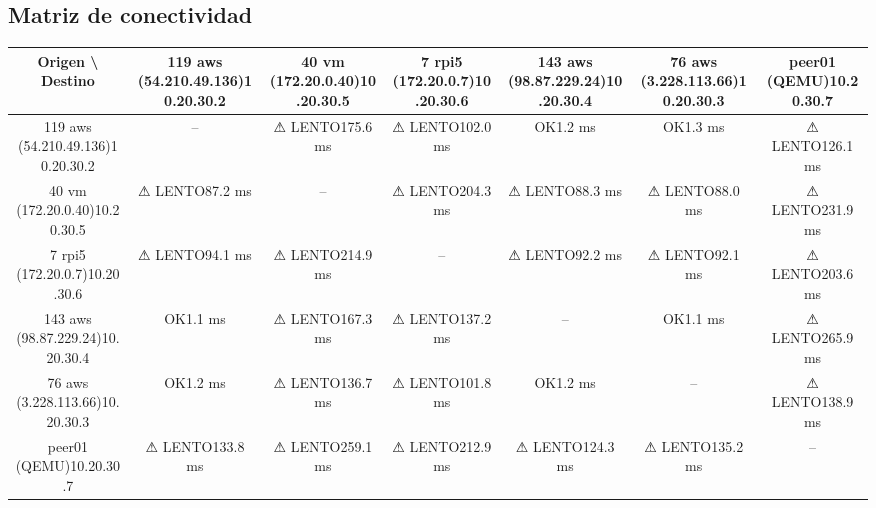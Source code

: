 \documentclass[11pt,a4paper]{article}
\begin{document}
\subsection{Matriz de conectividad}
\begin{longtable}{|c|c|c|c|c|c|c|}
\hline
Origen \textbackslash{} Destino & 119 aws (54.210.49.136)10.20.30.2 & 40 vm (172.20.0.40)10.20.30.5 & 7 rpi5 (172.20.0.7)10.20.30.6 & 143 aws (98.87.229.24)10.20.30.4 & 76 aws (3.228.113.66)10.20.30.3 & peer01 (QEMU)10.20.30.7 \\ \hline
119 aws (54.210.49.136)10.20.30.2 & -- & ⚠ LENTO175.6 ms & ⚠ LENTO102.0 ms & OK1.2 ms & OK1.3 ms & ⚠ LENTO126.1 ms \\ \hline
40 vm (172.20.0.40)10.20.30.5 & ⚠ LENTO87.2 ms & -- & ⚠ LENTO204.3 ms & ⚠ LENTO88.3 ms & ⚠ LENTO88.0 ms & ⚠ LENTO231.9 ms \\ \hline
7 rpi5 (172.20.0.7)10.20.30.6 & ⚠ LENTO94.1 ms & ⚠ LENTO214.9 ms & -- & ⚠ LENTO92.2 ms & ⚠ LENTO92.1 ms & ⚠ LENTO203.6 ms \\ \hline
143 aws (98.87.229.24)10.20.30.4 & OK1.1 ms & ⚠ LENTO167.3 ms & ⚠ LENTO137.2 ms & -- & OK1.1 ms & ⚠ LENTO265.9 ms \\ \hline
76 aws (3.228.113.66)10.20.30.3 & OK1.2 ms & ⚠ LENTO136.7 ms & ⚠ LENTO101.8 ms & OK1.2 ms & -- & ⚠ LENTO138.9 ms \\ \hline
peer01 (QEMU)10.20.30.7 & ⚠ LENTO133.8 ms & ⚠ LENTO259.1 ms & ⚠ LENTO212.9 ms & ⚠ LENTO124.3 ms & ⚠ LENTO135.2 ms & -- \\ \hline
\end{longtable}
\end{document}

